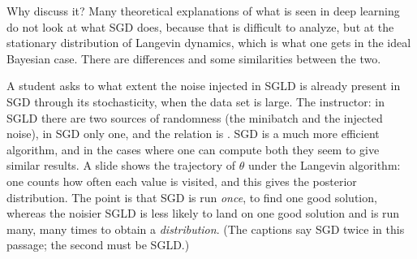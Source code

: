 Why discuss it? Many theoretical explanations of what is seen in deep learning do not look at what SGD does, because that is difficult to analyze, but at the stationary distribution of Langevin dynamics, which is what one gets in the ideal Bayesian case. There are differences and some similarities between the two.

\begin{discussion}
A student asks to what extent the noise injected in SGLD is already present in SGD through its stochasticity, when the data set is large. The instructor: in SGLD there are two sources of randomness (the minibatch and the injected noise), in SGD only one, and the relation is . SGD is a much more efficient algorithm, and in the cases where one can compute both they seem to give similar results. A slide shows the trajectory of $\theta$ under the Langevin algorithm: one counts how often each value is visited, and this gives the posterior distribution. The point is that SGD is run \emph{once}, to find one good solution, whereas the noisier SGLD is less likely to land on one good solution and is run many, many times to obtain a \emph{distribution}. (The captions say SGD twice in this passage; the second must be SGLD.)
\end{discussion}

